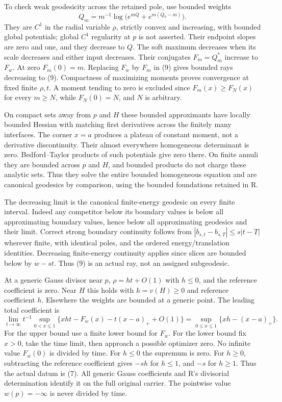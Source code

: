 \documentclass[
  11pt,
]{article}
\begin{document}
To check weak geodesicity across the retained pole, use bounded weights
\[
Q_m=m^{-1}\log\bigl(e^{mQ}+e^{m(Q_0-m)}\bigr).
\] They are \(C^1\) in the radial variable \(\rho\), strictly convex
and increasing, with bounded global potentials; global \(C^1\) regularity
at \(p\) is not asserted. Their endpoint slopes are zero and one,
and they decrease to \(Q\). The
soft maximum decreases when its scale decreases and either input
decreases. Their conjugates \(F_m=Q_m^*\) increase to \(F_w\). At zero
\(F_m(0)=m\). Replacing \(F_w\) by \(F_m\) in (9) gives bounded rays
decreasing to (9). Compactness of maximizing moments proves convergence
at fixed finite \(\rho,t\). A moment tending to zero is excluded since
\(F_m(x)\ge F_N(x)\) for every \(m\ge N\), while \(F_N(0)=N\), and \(N\)
is arbitrary.

On compact sets away from \(p\) and \(H\) these bounded approximants
have locally bounded Hessian with matching first derivatives across the
finitely many interfaces. The corner \(x=a\) produces a plateau of
constant moment, not a derivative discontinuity. Their almost everywhere
homogeneous determinant is zero. Bedford--Taylor products of such
potentials give zero there. On finite annuli they are bounded across
\(p\) and \(H\), and bounded products do not charge these analytic sets.
Thus they solve the entire bounded homogeneous equation and are
canonical geodesics by comparison, using the bounded foundations
retained in R.

The decreasing limit is the canonical finite-energy geodesic on every
finite interval. Indeed any competitor below its boundary values is
below all approximating boundary values, hence below all approximating
geodesics and their limit. Correct strong boundary continuity follows
from \(|b_{s,t}-b_{s,T}|\le s|t-T|\) wherever finite, with identical
poles, and the ordered energy/translation identities. Decreasing
finite-energy continuity applies since slices are bounded below by
\(w-st\). Thus (9) is an actual ray, not an assigned subgeodesic.

At a generic Gauss divisor near \(p\), \(\rho=ht+O(1)\) with \(h\le0\),
and the reference coefficient is zero. Near \(H\) this holds with
\(h=v(H)\ge0\) and reference coefficient \(h\). Elsewhere the weights
are bounded at a generic point. The leading total coefficient is \[
\lim_{t\to\infty}t^{-1}\sup_{0<x\le1}
\{xht-F_w(x)-t(x-a)_++O(1)\}
=\sup_{0\le x\le1}\{xh-(x-a)_+\}.
\tag{14}
\] For the upper bound use a finite lower bound for \(F_w\). For the
lower bound fix \(x>0\), take the time limit, then approach a possible
optimizer zero. No infinite value \(F_w(0)\) is divided by time. For
\(h\le0\) the supremum is zero. For \(h\ge0\), subtracting the reference
coefficient gives \(-sh\) for \(h\le1\), and \(-s\) for \(h\ge1\). Thus
the actual datum is (7). All generic Gauss coefficients and R's
divisorial determination identify it on the full original carrier. The
pointwise value \(w(p)=-\infty\) is never divided by time.
\end{document}
